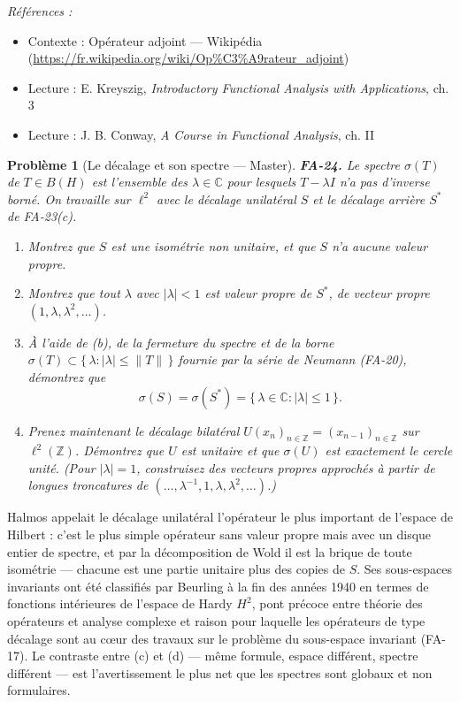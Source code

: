 \documentclass[11pt]{article}
\newtheorem{problem}{Problème}
\newenvironment{refs}{\par\small\noindent\emph{Références :}\begin{itemize}\setlength\itemsep{0pt}}{\end{itemize}\normalsize}
\begin{document}
\begin{refs}
\item Contexte : Opérateur adjoint --- Wikipédia (\url{https://fr.wikipedia.org/wiki/Op%C3%A9rateur_adjoint})
\item Lecture : E. Kreyszig, \textit{Introductory Functional Analysis with Applications}, ch. 3
\item Lecture : J. B. Conway, \textit{A Course in Functional Analysis}, ch. II
\end{refs}

\bigskip

\begin{problem}[{Le décalage et son spectre --- Master}]
\textbf{FA-24.} Le \textit{spectre} $ \sigma(T) $ de $ T \in B(H) $ est l'ensemble des
$ \lambda \in \mathbb{C} $ pour lesquels $ T - \lambda I $ n'a pas d'inverse borné. On travaille
sur $ \ell^2 $ avec le décalage unilatéral $ S $ et le décalage arrière $ S^{*} $ de
FA-23(c).
\begin{enumerate}
\item[(a)] Montrez que $ S $ est une isométrie non unitaire, et que $ S $ n'a aucune valeur
propre.
\item[(b)] Montrez que tout $ \lambda $ avec $ |\lambda| < 1 $ est valeur propre de $ S^{*} $, de
vecteur propre $ (1, \lambda, \lambda^2, \dots) $.
\item[(c)] À l'aide de (b), de la fermeture du spectre et de la borne
$ \sigma(T) \subset \{\, \lambda : |\lambda| \le \|T\| \,\} $ fournie par la série de Neumann
(FA-20), démontrez que
\[ \sigma(S) = \sigma(S^{*}) = \{\, \lambda \in \mathbb{C} : |\lambda| \le 1 \,\} . \]
\item[(d)] Prenez maintenant le décalage bilatéral $ U(x_n)_{n \in \mathbb{Z}} = (x_{n-1})_{n \in \mathbb{Z}} $
sur $ \ell^2(\mathbb{Z}) $. Démontrez que $ U $ est unitaire et que $ \sigma(U) $ est exactement
le cercle unité. (Pour $ |\lambda| = 1 $, construisez des vecteurs propres approchés à partir de
longues troncatures de $ (\dots, \lambda^{-1}, 1, \lambda, \lambda^{2}, \dots) $.)
\end{enumerate}

\end{problem}

\noindent Halmos appelait le décalage unilatéral l'opérateur le plus important de l'espace de
Hilbert : c'est le plus simple opérateur sans valeur propre mais avec un disque entier de spectre, et par
la décomposition de Wold il est la brique de toute isométrie --- chacune est une partie unitaire plus des
copies de $ S $. Ses sous-espaces invariants ont été classifiés par Beurling à la fin des années 1940
en termes de fonctions intérieures de l'espace de Hardy $ H^2 $, pont précoce entre théorie des
opérateurs et analyse complexe et raison pour laquelle les opérateurs de type décalage sont au c\oe{}ur des
travaux sur le problème du sous-espace invariant (FA-17). Le contraste entre (c) et (d) --- même formule,
espace différent, spectre différent --- est l'avertissement le plus net que les spectres sont globaux et
non formulaires.
\end{document}
